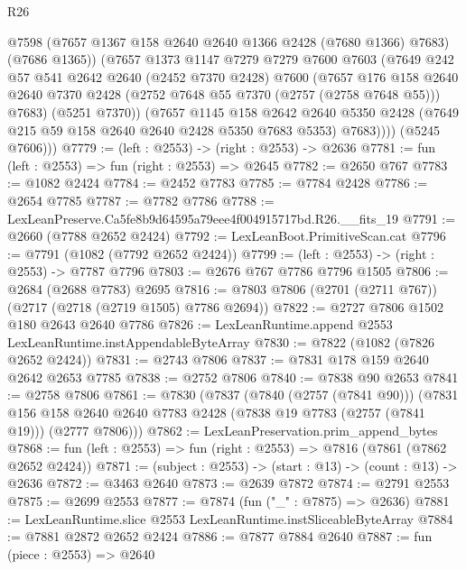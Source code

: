 \begin{lexlean}{R26}
\begin{coremodule}
              @7598
              (@7657 @1367 @158 @2640 @2640 @1366 @2428 (@7680 @1366) @7683)
              (@7686 @1365))
            (@7657
              @1373
              @1147
              @7279
              @7279
              @7600
              @7603
              (@7649
                @242
                @57
                @541
                @2642
                @2640
                (@2452 @7370 @2428)
                @7600
                (@7657
                  @176
                  @158
                  @2640
                  @2640
                  @7370
                  @2428
                  (@2752 @7648 @55 @7370 (@2757 (@2758 @7648 @55)))
                  @7683)
                (@5251 @7370))
              (@7657
                @1145
                @158
                @2642
                @2640
                @5350
                @2428
                (@7649 @215 @59 @158 @2640 @2640 @2428 @5350 @7683 @5353)
                @7683))))
        (@5245 @7606)))
@7779 := (left : @2553) -> (right : @2553) -> @2636
@7781 := fun (left : @2553) => fun (right : @2553) => @2645
@7782 := @2650 @767
@7783 := @1082 @2424
@7784 := @2452 @7783
@7785 := @7784 @2428
@7786 := @2654 @7785
@7787 := @7782 @7786
@7788 := LexLeanPreserve.Ca5fe8b9d64595a79eee4f004915717bd.R26.__fits_19
@7791 := @2660 (@7788 @2652 @2424)
@7792 := LexLeanBoot.PrimitiveScan.cat
@7796 := @7791 (@1082 (@7792 @2652 @2424))
@7799 := (left : @2553) -> (right : @2553) -> @7787 @7796
@7803 := @2676 @767 @7786 @7796 @1505
@7806 := @2684 (@2688 @7783) @2695
@7816 := @7803 @7806 (@2701 (@2711 @767)) (@2717 (@2718 (@2719 @1505) @7786 @2694))
@7822 := @2727 @7806 @1502 @180 @2643 @2640 @7786
@7826 := LexLeanRuntime.append @2553 LexLeanRuntime.instAppendableByteArray
@7830 := @7822 (@1082 (@7826 @2652 @2424))
@7831 := @2743 @7806
@7837 := @7831 @178 @159 @2640 @2642 @2653 @7785
@7838 := @2752 @7806
@7840 := @7838 @90 @2653
@7841 := @2758 @7806
@7861 := @7830
    (@7837
      (@7840 (@2757 (@7841 @90)))
      (@7831 @156 @158 @2640 @2640 @7783 @2428 (@7838 @19 @7783 (@2757 (@7841 @19))) (@2777 @7806)))
@7862 := LexLeanPreservation.prim_append_bytes
@7868 := fun (left : @2553) => fun (right : @2553) => @7816 (@7861 (@7862 @2652 @2424))
@7871 := (subject : @2553) -> (start : @13) -> (count : @13) -> @2636
@7872 := @3463 @2640
@7873 := @2639 @7872
@7874 := @2791 @2553
@7875 := @2699 @2553
@7877 := @7874 (fun ("_" : @7875) => @2636)
@7881 := LexLeanRuntime.slice @2553 LexLeanRuntime.instSliceableByteArray
@7884 := @7881 @2872 @2652 @2424
@7886 := @7877 @7884 @2640
@7887 := fun (piece : @2553) => @2640

\end{coremodule}
\end{lexlean}
